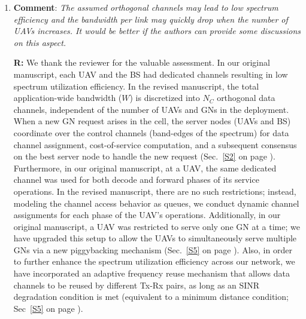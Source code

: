 \documentclass[12pt, draftcls, onecolumn]{IEEEtran}
\theoremstyle{plain}
\theoremstyle{definition}
\theoremstyle{remark}
\begin{document}
\begin{enumerate}
\item \textbf{Comment}: \emph{The assumed orthogonal channels may lead to low spectrum efficiency and the bandwidth per link may quickly drop when the number of UAVs increases. It would be better if the authors can provide some discussions on this aspect.}

\textbf{R:} 
We thank the reviewer for the valuable assessment. In our original manuscript, each UAV and the BS had dedicated channels resulting in low spectrum utilization efficiency. In the revised manuscript, the total application-wide bandwidth ($W$) is discretized into $N_{C}$ orthogonal data channels, independent of the number of UAVs and GNs in the deployment. When a new GN request arises in the cell, the server nodes (UAVs and BS) coordinate over the control channels (band-edges of the spectrum) for data channel assignment, cost-of-service computation, and a subsequent consensus on the best server node to handle the new request (Sec.~\ref{S2} on page \pageref{comm_model_label}). Furthermore, in our original manuscript, at a UAV, the same dedicated channel was used for both decode and forward phases of its service operations. In the revised manuscript, there are no such restrictions; instead, modeling the channel access behavior as queues, we conduct dynamic channel assignments for each phase of the UAV's operations. Additionally, in our original manuscript, a UAV was restricted to serve only one GN at a time; we have upgraded this setup to allow the UAVs to simultaneously serve multiple GNs via a new piggybacking mechanism (Sec.~\ref{S5} on page \pageref{pb_label}). Also, in order to further enhance the spectrum utilization efficiency across our network, we have incorporated an adaptive frequency reuse mechanism that allows data channels to be reused by different Tx-Rx pairs, as long as an SINR degradation condition is met (equivalent to a minimum distance condition; Sec~\ref{S5} on page \pageref{freq_reuse_label}).
\vspace{2mm}


\end{enumerate}
\end{document}
